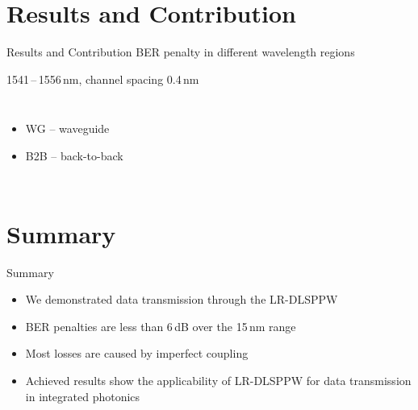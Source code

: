 




\section{Results and Contribution}
  \begin{frame}{Results and Contribution}
               {BER penalty in different wavelength regions}
    \begin{block}{1541\,–\,1556\,nm, channel spacing 0.4\,nm}
      \begin{columns}
        \vspace{-2mm}
        \vspace{3.2cm}
        \begin{itemize}
          \item WG – waveguide
          \item B2B – back-to-back
        \end{itemize}
      \end{columns}
    \end{block}
  \end{frame}


\section*{Summary}
  \begin{frame}{Summary}
    \begin{itemize}
    \item[\cmark] We demonstrated data transmission through the LR-DLSPPW
    \item[\cmark] BER penalties are less than 6\,dB over the 15\,nm range
    \item[\xmark] Most losses are caused by imperfect coupling
    \end{itemize}
    \begin{itemize}
    \item[\cmark] Achieved results show the applicability of LR-DLSPPW for data transmission in integrated photonics
    \end{itemize}
  \end{frame}




